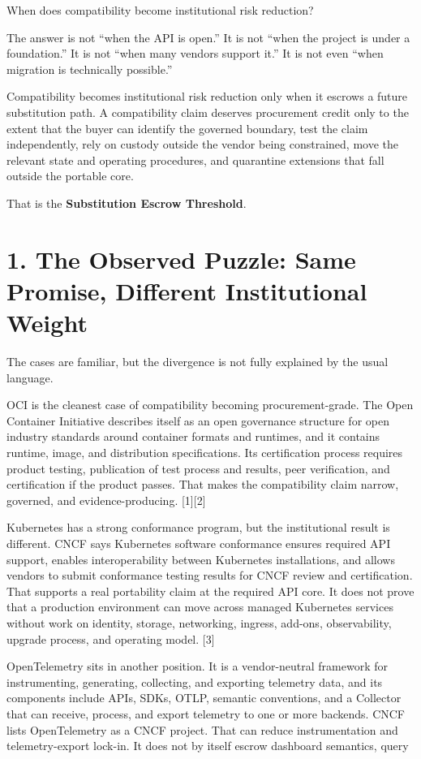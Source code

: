 \documentclass[11pt]{article}
\begin{document}
When does compatibility become institutional risk reduction?

The answer is not ``when the API is open.'' It is not ``when the project is under a foundation.'' It is not ``when many vendors support it.'' It is not even ``when migration is technically possible.''

Compatibility becomes institutional risk reduction only when it escrows a future substitution path. A compatibility claim deserves procurement credit only to the extent that the buyer can identify the governed boundary, test the claim independently, rely on custody outside the vendor being constrained, move the relevant state and operating procedures, and quarantine extensions that fall outside the portable core.

That is the \textbf{Substitution Escrow Threshold}.

\section{1. The Observed Puzzle: Same Promise, Different Institutional Weight}\label{the-observed-puzzle-same-promise-different-institutional-weight}

The cases are familiar, but the divergence is not fully explained by the usual language.

OCI is the cleanest case of compatibility becoming procurement-grade. The Open Container Initiative describes itself as an open governance structure for open industry standards around container formats and runtimes, and it contains runtime, image, and distribution specifications. Its certification process requires product testing, publication of test process and results, peer verification, and certification if the product passes. That makes the compatibility claim narrow, governed, and evidence-producing. {[}1{]}{[}2{]}

Kubernetes has a strong conformance program, but the institutional result is different. CNCF says Kubernetes software conformance ensures required API support, enables interoperability between Kubernetes installations, and allows vendors to submit conformance testing results for CNCF review and certification. That supports a real portability claim at the required API core. It does not prove that a production environment can move across managed Kubernetes services without work on identity, storage, networking, ingress, add-ons, observability, upgrade process, and operating model. {[}3{]}

OpenTelemetry sits in another position. It is a vendor-neutral framework for instrumenting, generating, collecting, and exporting telemetry data, and its components include APIs, SDKs, OTLP, semantic conventions, and a Collector that can receive, process, and export telemetry to one or more backends. CNCF lists OpenTelemetry as a CNCF project. That can reduce instrumentation and telemetry-export lock-in. It does not by itself escrow dashboard semantics, query
\end{document}
